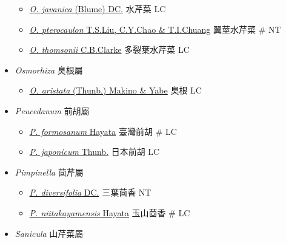 \begin{itemize}
  \begin{itemize}
        \item[] \href{http://www.theplantlist.org/tpl1.1/search?q=Oenanthe+javanica}{\textit{O. javanica} (Blume) DC.}   水芹菜   LC
        \item[] \href{http://www.theplantlist.org/tpl1.1/search?q=Oenanthe+pterocaulon}{\textit{O. pterocaulon} T.S.Liu, C.Y.Chao \& T.I.Chuang}   翼莖水芹菜  \# NT
        \item[] \href{http://www.theplantlist.org/tpl1.1/search?q=Oenanthe+thomsonii}{\textit{O. thomsonii} C.B.Clarke}   多裂葉水芹菜   LC
  \end{itemize}
 \item[] \textit{Osmorhiza} 臭根屬
                                
  \begin{itemize}
        \item[] \href{http://www.theplantlist.org/tpl1.1/search?q=Osmorhiza+aristata}{\textit{O. aristata} (Thunb.) Makino \& Yabe}   臭根   LC
  \end{itemize}
 \item[] \textit{Peucedanum} 前胡屬
                                
  \begin{itemize}
        \item[] \href{http://www.theplantlist.org/tpl1.1/search?q=Peucedanum+formosanum}{\textit{P. formosanum} Hayata}   臺灣前胡  \# LC
        \item[] \href{http://www.theplantlist.org/tpl1.1/search?q=Peucedanum+japonicum}{\textit{P. japonicum} Thunb.}   日本前胡   LC
  \end{itemize}
 \item[] \textit{Pimpinella} 茴芹屬
                                
  \begin{itemize}
        \item[] \href{http://www.theplantlist.org/tpl1.1/search?q=Pimpinella+diversifolia}{\textit{P. diversifolia} DC.}   三葉茴香   NT
        \item[] \href{http://www.theplantlist.org/tpl1.1/search?q=Pimpinella+niitakayamensis}{\textit{P. niitakayamensis} Hayata}   玉山茴香  \# LC
  \end{itemize}
 \item[] \textit{Sanicula} 山芹菜屬
                                

\end{itemize}
